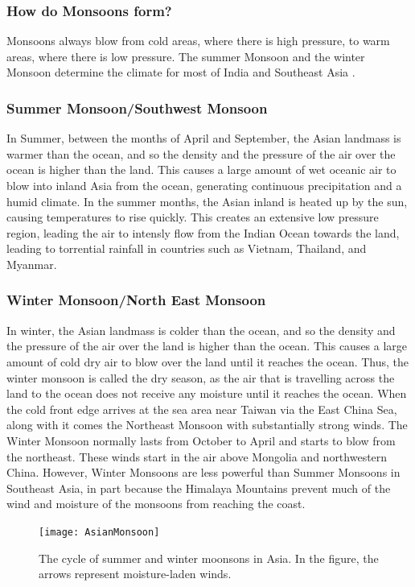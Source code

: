 \subsubsection{How do Monsoons form?}
Monsoons always blow from cold areas, where there is high pressure, to warm areas, where there is low pressure. The summer Monsoon and the winter Monsoon determine the climate for most of India and Southeast Asia \citep{monsoonform}. 
 
\subsubsection{Summer Monsoon/Southwest Monsoon}
In Summer, between the months of April and September, the Asian landmass is warmer than the ocean, and so the density and the pressure of the air over the ocean is higher than the land. This causes a large amount of wet oceanic air to blow into inland Asia from the ocean, generating continuous precipitation and a humid climate. In the summer months, the Asian inland is heated up by the sun, causing temperatures to rise quickly. This creates an extensive low pressure region, leading the air to intensly flow from the Indian Ocean towards the land, leading to torrential rainfall in countries such as Vietnam, Thailand, and Myanmar. \citep{monsoonform}

\subsubsection{Winter Monsoon/North East Monsoon}
In winter, the Asian landmass is colder than the ocean, and so the density and the pressure of the air over the land is higher than the ocean. This causes a large amount of cold dry air to blow over the land until it reaches the ocean. Thus, the winter monsoon is called the dry season, as the air that is travelling across the land to the ocean does not receive any moisture until it reaches the ocean. When the cold front edge arrives at the sea area near Taiwan via the East China Sea, along with it comes the Northeast Monsoon with substantially strong winds. The Winter Monsoon normally lasts from October to April and starts to blow from the northeast. These winds start in the air above Mongolia and northwestern China. However, Winter Monsoons are less powerful than Summer Monsoons in Southeast Asia, in part because the Himalaya Mountains prevent much of the wind and moisture of the monsoons from reaching the coast. \citep{monsoonform}
 
 \begin{figure}[h!]
  \centering
  \texttt{[image: AsianMonsoon]}
  \caption{The cycle of summer and winter moonsons in Asia. In the figure, the arrows represent moisture-laden winds.}
  \label{fig:asianmonsoon}
\end{figure}
 
